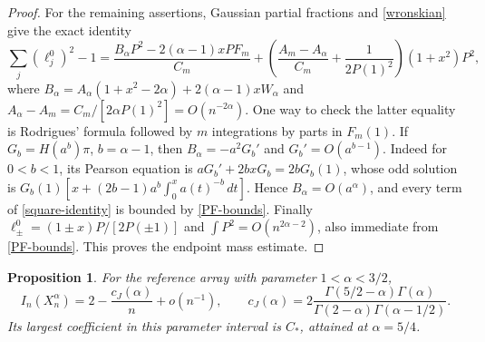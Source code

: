 \documentclass[a4paper,11pt]{amsart}
\newtheorem{proposition}[theorem]{Proposition}
\theoremstyle{remark}\newtheorem{remark}[theorem]{Remark}
\newcommand{\dd}{\,d}
\newcommand{\Cstar}{C_*}
\begin{document}
\begin{proof}
For the remaining assertions, Gaussian partial fractions and
\eqref{wronskian} give the exact identity
\begin{equation}\label{square-identity}
 \sum_j(\ell_j^0)^2-1
 =\frac{B_\alpha P^2-2(\alpha-1)xPF_m}{C_m}
 +\left(\frac{A_m-A_\alpha}{C_m}+\frac1{2P(1)^2}\right)(1+x^2)P^2,
\end{equation}
where
$B_\alpha=A_\alpha(1+x^2-2\alpha)+2(\alpha-1)xW_\alpha$
and $A_\alpha-A_m=C_m/[2\alpha P(1)^2]=O(n^{-2\alpha})$.
One way to check the latter equality is Rodrigues' formula followed
by $m$ integrations by parts in $F_m(1)$.
If $G_b=H(a^b)\pi$, $b=\alpha-1$, then
$B_\alpha=-a^2G_b'$ and $G_b'=O(a^{b-1})$.
Indeed for $0<b<1$, its Pearson equation is
$aG_b'+2bxG_b=2bG_b(1)$, whose odd solution is
$G_b(1)[x+(2b-1)a^b\int_0^x a(t)^{-b}\dd t]$.
Hence $B_\alpha=O(a^\alpha)$, and every term of
\eqref{square-identity} is bounded by \eqref{PF-bounds}.
Finally $\ell_\pm^0=(1\pm x)P/[2P(\pm1)]$ and
$\int P^2=O(n^{2\alpha-2})$, also immediate from
\eqref{PF-bounds}. This proves the endpoint mass estimate.
\end{proof}

\begin{proposition}\label{construction}
For the reference array with parameter $1<\alpha<3/2$,
\begin{equation}\label{cj}
 I_n(X_n^\alpha)=2-\frac{c_J(\alpha)}n+o(n^{-1}),\qquad
 c_J(\alpha)=2\frac{\Gamma(5/2-\alpha)\Gamma(\alpha)}
 {\Gamma(2-\alpha)\Gamma(\alpha-1/2)}.
\end{equation}
Its largest coefficient in this parameter interval is $\Cstar$,
attained at $\alpha=5/4$.
\end{proposition}
\end{document}
